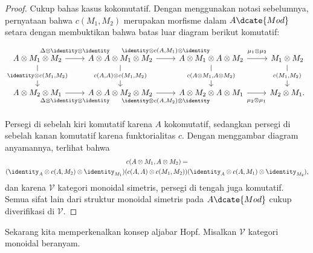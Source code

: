 \begin{proof}
	Cukup bahas kasus kokomutatif. Dengan menggunakan notasi sebelumnya,
	pernyataan bahwa $c(M_1,M_2)$ merupakan morfisme dalam $A\dcate{Mod}$
	setara dengan membuktikan bahwa batas luar diagram berikut komutatif:
	\[\begin{tikzcd}[row sep=large]
		A \otimes M_1 \otimes M_2 \arrow[r, "{\Delta \otimes \identity \otimes \identity}" inner sep=0.6em] \arrow[d, "{\identity \otimes c(M_1, M_2)}" description] & A \otimes A \otimes M_1 \otimes M_2 \arrow[r, "{\identity \otimes c(A, M_1) \otimes \identity}" inner sep=0.6em] \arrow[d, "{c(A, A) \otimes c(M_1, M_2)}" description] & A \otimes M_1 \otimes A \otimes M_2 \arrow[r, "{\mu_1 \otimes \mu_2}" inner sep=0.6em] \arrow[d, "{c(A \otimes M_1, A \otimes M_2)}" description] & M_1 \otimes M_2 \arrow[d, "{c(M_1, M_2)}" description] \\
		A \otimes M_2 \otimes M_1 \arrow[r, "{\Delta \otimes \identity \otimes \identity}"' inner sep=0.6em] & A \otimes A \otimes M_2 \otimes M_2 \arrow[r, "{\identity \otimes c(A, M_2) \otimes \identity}"' inner sep=0.6em] & A \otimes M_2 \otimes A \otimes M_1 \arrow[r, "{\mu_2 \otimes \mu_1}"' inner sep=0.6em] & M_2 \otimes M_1 .
	\end{tikzcd}\]

	Persegi di sebelah kiri komutatif karena $A$ kokomutatif, sedangkan persegi
	di sebelah kanan komutatif karena funktorialitas $c$. Dengan menggambar
	diagram anyamannya, terlihat bahwa
	\begin{multline*}
		c(A \otimes M_1, A \otimes M_2) = \\
		(\identity_A \otimes c(A, M_2) \otimes \identity_{M_1}) (c(A, A) \otimes c(M_1, M_2)) (\identity_A \otimes c(A, M_1) \otimes \identity_{M_2}),
	\end{multline*}
	dan karena $\mathcal{V}$ kategori monoidal simetris, persegi di tengah juga
	komutatif. Semua sifat lain dari struktur monoidal simetris pada
	$A\dcate{Mod}$ cukup diverifikasi di $\mathcal{V}$.
\end{proof}

Sekarang kita memperkenalkan konsep aljabar Hopf. Misalkan $\mathcal{V}$
kategori monoidal beranyam.

